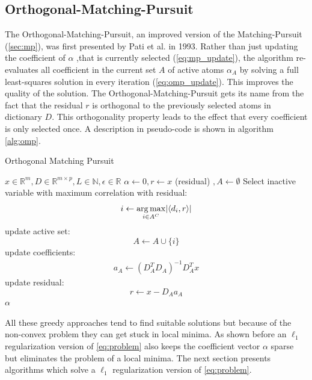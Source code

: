\subsection{Orthogonal-Matching-Pursuit}
\label{sec:omp}
The Orthogonal-Matching-Pursuit, an improved version of
the Matching-Pursuit (\ref{sec:mp}), was first presented by Pati et al.
in 1993\cite{Pati1993}. Rather than just updating the coefficient of $\alpha$
,that is currently selected (\ref{eq:mp_update}), the algorithm re-evaluates
all coefficient in the current set $A$ of active atoms 
$\alpha_A$ by solving a full least-squares solution in every iteration
(\ref{eq:omp_update}). This improves the quality of the
solution\cite{Pati1993}. The Orthogonal-Matching-Pursuit gets its name from
the fact that the residual $r$ is orthogonal to the previously selected atoms
in dictionary $D$. This orthogonality property leads to the effect that every
coefficient is only selected once. A description in pseudo-code is shown in
algorithm \ref{alg:omp}.
\begin{algorithm}[H]
\caption{Orthogonal Matching Pursuit}
\label{alg:omp}
\begin{algorithmic}[1]
\REQUIRE $x \in \mathbb{R}^m, D \in \mathbb{R}^{m\times p}, L \in \mathbb{N},
\epsilon \in \mathbb{R}$
\STATE $\alpha \gets 0, r \gets x $ (residual) $, A \gets \emptyset$
\STATE Select inactive variable with maximum correlation with residual: 
\begin{equation*}
i \gets \operatorname*{arg\,max}_{i \in A^C} \lvert \left<d_i,r\right> \rvert
\end{equation*}
\STATE update active set:
\begin{equation*}
 A \gets A \cup \{i\} 
\end{equation*}
\STATE update coefficients: 
\begin{align}
a_A \gets \left( D_A^T D_A \right)^{-1} D_A^T x  \label{eq:omp_update}
\end{align}\label{alg:OMP_DTD}
\STATE update residual:
\begin{equation*}
 r \gets x-D_Aa_A
\end{equation*}
\ENDFOR
\RETURN $\alpha$
\end{algorithmic}
\end{algorithm}
All these greedy approaches tend to find suitable solutions but
because of the non-convex problem they can get stuck in local minima. As shown
before an $\ell_1$ regularization version of \ref{eq:problem} also keeps the
coefficient vector $\alpha$ sparse but eliminates the problem of a local minima.
The next section presents algorithms which solve  a $\ell_1$ regularization
version of \ref{eq:problem}.



